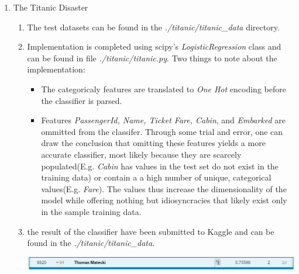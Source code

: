 \documentclass{report}
\begin{document}
\begin{enumerate}
	\newpage
	
	\item The Titanic Disaster
	\begin{enumerate}[label=(\alph*)]
		\item The test datasets can be found in the \textit{./titanic/titanic\_data} directory.
		\item Implementation is completed using scipy's \textit{LogisticRegression} class and can be found in file \textit{./titanic/titanic.py}. Two things to note about the implementation:
		\begin{itemize}
		\item The categoricaly features are translated to \textit{One Hot} encoding before the classifier is parsed.
		\item Features \textit{PassengerId, Name, Ticket Fare, Cabin}, and \textit{Embarked} are ommitted from the classifer.  Through some trial and error, one can draw the conclusion that omitting these features yields a more accurate classifier, most likely because they are scarcely populated(E.g. \textit{Cabin} has values in the test set do not exist in the training data) or contain a a high number of unique, categorical values(E.g. \textit{Fare}). The values thus increase the dimensionality of the model while offering nothing but idiosyncracies that likely exist only in the sample training data.
		\end{itemize}
		\item the result of the classifier have been submitted to Kaggle and can be found in the \textit{./titanic/titanic\_data}. 
		\begin{center}
		\includegraphics[width=16cm]{images/titanic_kaggle.png}
		\end{center}
	\end{enumerate}
	
\end{enumerate}
\end{document}
